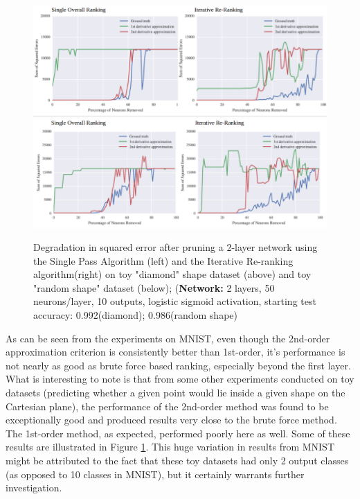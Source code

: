 \begin{figure}[!hb]
\centering
\includegraphics[width=0.80\linewidth]{png/diamond.png}
\includegraphics[width=0.80\linewidth]{png/rshape.png}
\caption{Degradation in squared error after pruning a 2-layer network using the Single Pass Algorithm (left) and the Iterative Re-ranking algorithm(right) on toy "diamond" shape dataset (above) and toy "random shape" dataset (below); (\textbf{Network:} 2 layers, 50 neurons/layer, 10 outputs, logistic sigmoid activation, starting test accuracy: 0.992(diamond); 0.986(random shape)}
\label{fig:diamond}
\end{figure}

As can be seen from the experiments on MNIST, even though the 2nd-order approximation criterion is consistently better than 1st-order, it's performance is not nearly as good as brute force based ranking, especially beyond the first layer. What is interesting to note is that from some other experiments conducted on toy datasets (predicting whether a given point would lie inside a given shape on the Cartesian plane), the performance of the 2nd-order method was found to be exceptionally good and produced results very close to the brute force method. The 1st-order method, as expected, performed poorly here as well. Some of these results are illustrated in Figure \ref{fig:diamond}. This huge variation in results from MNIST might be attributed to the fact that these toy datasets had only 2 output classes (as opposed to 10 classes in MNIST), but it certainly warrants further investigation.
